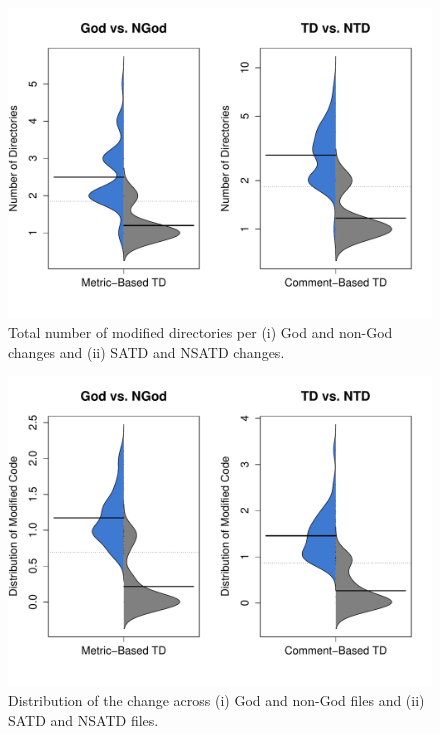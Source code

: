 \begin{figure}[!hp]
	\centering
	\includegraphics[width=120mm]{figures/chapter4/rq3_nd}
	\caption{Total number of modified directories per (i) God and non-God changes and (ii) SATD and NSATD changes.}
	\label{figure:ch4_number_of_directories}
\end{figure}



\begin{figure}[!hp]
	\centering
	\includegraphics[width=120mm]{figures/chapter4/rq3_entropy}
	\caption{Distribution of the change across (i) God and non-God files and (ii) SATD and NSATD files.}
	\label{figure:ch4_mtdocatdf}
\end{figure}




